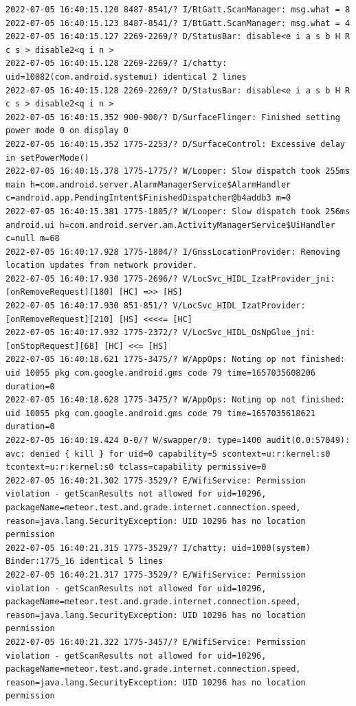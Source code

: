 \documentclass[a4paper,12pt]{book}
\begin{document}
\begin{lstlisting}
2022-07-05 16:40:15.120 8487-8541/? I/BtGatt.ScanManager: msg.what = 8
2022-07-05 16:40:15.123 8487-8541/? I/BtGatt.ScanManager: msg.what = 4
2022-07-05 16:40:15.127 2269-2269/? D/StatusBar: disable<e i a s b H R c s > disable2<q i n >
2022-07-05 16:40:15.128 2269-2269/? I/chatty: uid=10082(com.android.systemui) identical 2 lines
2022-07-05 16:40:15.128 2269-2269/? D/StatusBar: disable<e i a s b H R c s > disable2<q i n >
2022-07-05 16:40:15.352 900-900/? D/SurfaceFlinger: Finished setting power mode 0 on display 0
2022-07-05 16:40:15.352 1775-2253/? D/SurfaceControl: Excessive delay in setPowerMode()
2022-07-05 16:40:15.378 1775-1775/? W/Looper: Slow dispatch took 255ms main h=com.android.server.AlarmManagerService$AlarmHandler c=android.app.PendingIntent$FinishedDispatcher@b4addb3 m=0
2022-07-05 16:40:15.381 1775-1805/? W/Looper: Slow dispatch took 256ms android.ui h=com.android.server.am.ActivityManagerService$UiHandler c=null m=68
2022-07-05 16:40:17.928 1775-1804/? I/GnssLocationProvider: Removing location updates from network provider.
2022-07-05 16:40:17.930 1775-2696/? V/LocSvc_HIDL_IzatProvider_jni: [onRemoveRequest][180] [HC] =>> [HS]
2022-07-05 16:40:17.930 851-851/? V/LocSvc_HIDL_IzatProvider: [onRemoveRequest][210] [HS] <<<<= [HC]
2022-07-05 16:40:17.932 1775-2372/? V/LocSvc_HIDL_OsNpGlue_jni: [onStopRequest][68] [HC] <<= [HS]
2022-07-05 16:40:18.621 1775-3475/? W/AppOps: Noting op not finished: uid 10055 pkg com.google.android.gms code 79 time=1657035608206 duration=0
2022-07-05 16:40:18.628 1775-3475/? W/AppOps: Noting op not finished: uid 10055 pkg com.google.android.gms code 79 time=1657035618621 duration=0
2022-07-05 16:40:19.424 0-0/? W/swapper/0: type=1400 audit(0.0:57049): avc: denied { kill } for uid=0 capability=5 scontext=u:r:kernel:s0 tcontext=u:r:kernel:s0 tclass=capability permissive=0
2022-07-05 16:40:21.302 1775-3529/? E/WifiService: Permission violation - getScanResults not allowed for uid=10296, packageName=meteor.test.and.grade.internet.connection.speed, reason=java.lang.SecurityException: UID 10296 has no location permission
2022-07-05 16:40:21.315 1775-3529/? I/chatty: uid=1000(system) Binder:1775_16 identical 5 lines
2022-07-05 16:40:21.317 1775-3529/? E/WifiService: Permission violation - getScanResults not allowed for uid=10296, packageName=meteor.test.and.grade.internet.connection.speed, reason=java.lang.SecurityException: UID 10296 has no location permission
2022-07-05 16:40:21.322 1775-3457/? E/WifiService: Permission violation - getScanResults not allowed for uid=10296, packageName=meteor.test.and.grade.internet.connection.speed, reason=java.lang.SecurityException: UID 10296 has no location permission

\end{lstlisting}
\end{document}

